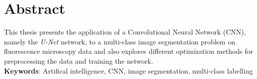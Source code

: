 \chapter*{Abstract}

\noindent This thesis presents the application of a Convolutional Neural Network (CNN), namely the \textit{U-Net} network, to a multi-class image segmentation problem on fluorescence microscopy data and also explores different optimization methods for preprocessing the data and training the network.\\

\noindent \textbf{Keywords}: Artifical intelligence, CNN, image segmentation, multi-class labelling